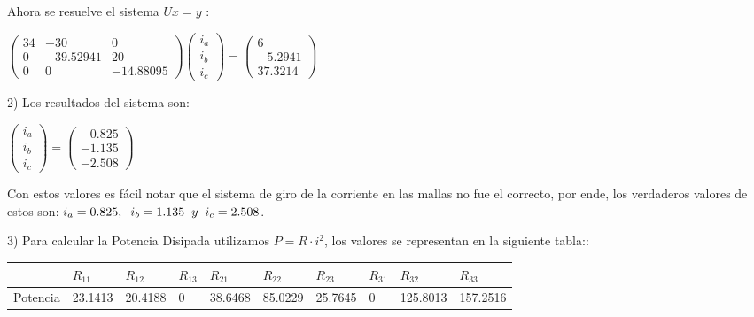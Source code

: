 \documentclass[10pt,twoside]{article}
\begin{document}
\begin{flushleft}
\begin{center}
\vspace{3mm}
Ahora se resuelve el sistema $Ux = y$ :
\vspace{1.5mm}

$
\begin{pmatrix}
  34  & -30 &  0  \\
   0  & -39.52941 &  20  \\
   0 &  0 &  -14.88095
 \end{pmatrix}
 \begin{pmatrix}
  i_a \\
   i_b \\
   i_c
  \end{pmatrix}
   = \begin{pmatrix}
   6 \\
   -5.2941 \\
   37.3214  
  \end{pmatrix}
$
\end{center}

2) Los resultados del sistema son:
\begin{center}
$
\begin{pmatrix}
  i_a \\
   i_b \\
   i_c
  \end{pmatrix}
   = \begin{pmatrix}
  -0.825 \\
   -1.135 \\
   -2.508   
  \end{pmatrix}
$

Con estos valores es fácil notar que el sistema de giro de la corriente en las mallas no fue el correcto, por ende, los verdaderos valores de estos son: $i_a = 0.825, \hspace{2mm} i_b = 1.135 \hspace{2mm} y\hspace{2mm} i_c = 2.508$.
\end{center}

3) Para calcular la Potencia Disipada utilizamos $P = R \cdot i^2$, los valores se representan en la siguiente tabla::

\begin{center}
\begin{tabular}{l|lllllllll}
 & $R_{11}$& $R_{12}$& $R_{13}$& $R_{21}$& $R_{22}$& $R_{23}$& $R_{31}$& $R_{32}$& $R_{33}$ \\\hline
 Potencia &  23.1413 & 20.4188 & 0 & 38.6468 & 85.0229 & 25.7645 & 0 & 125.8013 & 157.2516  
\end{tabular}

\end{center}


\end{flushleft}
\end{document}
